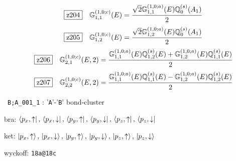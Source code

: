 \documentclass[fleqn,10pt,landscape]{jsarticle}
\begin{document}
\begin{dmath*}
\hspace*{3mm}\fbox{z204}\quad \mathbb{G}_{1,1}^{(1,0;c)}(E)=\frac{\sqrt{2} \mathbb{G}_{1,1}^{(1,0;a)}(E) \mathbb{Q}_{0}^{(s)}(A_{1})}{2}
\end{dmath*}
\begin{dmath*}
\hspace*{3mm}\fbox{z205}\quad \mathbb{G}_{1,2}^{(1,0;c)}(E)=\frac{\sqrt{2} \mathbb{G}_{1,2}^{(1,0;a)}(E) \mathbb{Q}_{0}^{(s)}(A_{1})}{2}
\end{dmath*}
\begin{dmath*}
\hspace*{3mm}\fbox{z206}\quad \mathbb{G}_{2,1}^{(1,0;c)}(E,2)=\frac{\mathbb{G}_{1,1}^{(1,0;a)}(E) \mathbb{Q}_{1,2}^{(s)}(E) + \mathbb{G}_{1,2}^{(1,0;a)}(E) \mathbb{Q}_{1,1}^{(s)}(E)}{2}
\end{dmath*}
\begin{dmath*}
\hspace*{3mm}\fbox{z207}\quad \mathbb{G}_{2,2}^{(1,0;c)}(E,2)=\frac{\mathbb{G}_{1,1}^{(1,0;a)}(E) \mathbb{Q}_{1,1}^{(s)}(E) - \mathbb{G}_{1,2}^{(1,0;a)}(E) \mathbb{Q}_{1,2}^{(s)}(E)}{2}
\end{dmath*}
\vspace{5mm}

\noindent\textbullet\, \texttt{B;A_001_1} : '\texttt{A}'-'\texttt{B}' bond-cluster

\noindent\quad * bra: $\bra{p_{x},\uparrow},\, \bra{p_{x},\downarrow},\, \bra{p_{y},\uparrow},\, \bra{p_{y},\downarrow},\, \bra{p_{z},\uparrow},\, \bra{p_{z},\downarrow}$

\noindent\quad * ket: $\ket{p_{x},\uparrow},\, \ket{p_{x},\downarrow},\, \ket{p_{y},\uparrow},\, \ket{p_{y},\downarrow},\, \ket{p_{z},\uparrow},\, \ket{p_{z},\downarrow}$

\noindent\quad * wyckoff: \texttt{18a@18c}
\end{document}

